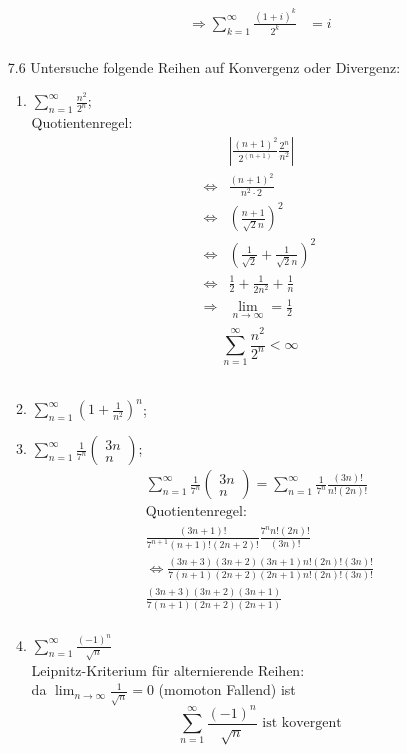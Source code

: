 \documentclass{HM}
\begin{document}
\begin{enumerate}
\begin{enumerate}
\begin{align*}
	\\
	\Rightarrow \sum\limits_{k=1}^\infty\frac{(1+i)^k}{2^k} &= i\\
\end{align*}
\end{enumerate}
\item[7.6] Untersuche folgende Reihen auf Konvergenz oder Divergenz:
\begin{enumerate}
\item $\sum\limits_{n=1}^\infty\frac{n^2}{2^n}$;\\
Quotientenregel:
\begin{align*}
	&\left|\frac{(n+1)^2}{2^(n+1)}\frac{2^n}{n^2}\right|\\
	\Leftrightarrow &\frac{(n+1)^2}{n^2\cdot 2}\\
	\Leftrightarrow &\left(\frac{n+1}{\sqrt{2}n}\right)^2\\
	\Leftrightarrow &\left(\frac{1}{\sqrt{2}}+\frac{1}{\sqrt{2}n}\right)^2\\
	\Leftrightarrow &\frac{1}{2} + \frac{1}{2n^2} + \frac{1}{n}\\
	\Rightarrow &\lim_{n\to\infty} = \frac{1}{2}\\
\end{align*}
$$\sum\limits_{n=1}^\infty\frac{n^2}{2^n} < \infty$$\\

\item $\sum\limits_{n=1}^\infty(1+\frac{1}{n^2})^n$;\\

\item $\sum\limits_{n=1}^\infty\frac{1}{7^n}\begin{pmatrix}
3n\\
n
\end{pmatrix}$;\\
\begin{align*}
	\sum\limits_{n=1}^\infty\frac{1}{7^n}\begin{pmatrix}
		3n\\
		n
	\end{pmatrix} = \sum\limits_{n=1}^\infty\frac{1}{7^n} \frac{(3n)!}{n!(2n)!}\\
	\text{Quotientenregel:}\\
	\frac{(3n+1)!}{7^{n+1}(n+1)!(2n+2)!}\frac{7^nn!(2n)!}{(3n)!}\\
	\Leftrightarrow \frac{(3n+3)(3n+2)(3n+1)n!(2n)!(3n)!}{7(n+1)(2n+2)(2n+1)n!(2n)!(3n)!}\\
	\frac{(3n+3)(3n+2)(3n+1)}{7(n+1)(2n+2)(2n+1)}\\
	\end{align*}
\item $\sum\limits_{n=1}^\infty\frac{(-1)^n}{\sqrt{n}}$\\
Leipnitz-Kriterium für alternierende Reihen:\\
da $\lim_{n\to\infty} \frac{1}{\sqrt{n}} = 0$ (momoton Fallend) ist $$\sum\limits_{n=1}^\infty\frac{(-1)^n}{\sqrt{n}}\text{ ist kovergent}$$ 

\end{enumerate}

\end{enumerate}
\end{document}
